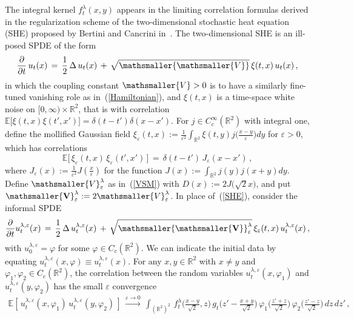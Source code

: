 \documentclass[10pt]{article}
\def\stackrel#1#2{\mathrel{\mathop{#2}\limits^{#1}}}
\numberwithin{equation}{section}
\theoremstyle{definition}
\newcommand{\R}{{\mathbb R}}
\newcommand{\vsm}{{\mathsmaller{\mathsmaller{V}}}}
\newcommand{\Da}{{D}}
\begin{document}
The integral kernel $f_{t}^{\lambda}(x,y)$ appears in the limiting correlation formulas derived in the regularization scheme of the two-dimensional stochastic heat equation (SHE) proposed by Bertini and Cancrini in~\cite{BC}.  The two-dimensional SHE is  an ill-posed SPDE of the form
\begin{align}\label{SHE}\frac{\partial}{\partial t}\,u_t(x)\,=\,\frac{1}{2}\,\Delta\, u_t(x)\,+\, \sqrt{\vsm }\,\xi (t,x)\,u_t(x) \,,  \end{align}
in which the coupling constant $\mathsmaller{V}>0$ is to have a similarly fine-tuned vanishing role as in~(\ref{Hamiltonian}), and $\xi(t,x)$ is a time-space white noise on $[0,\infty)\times \R^2$, that is with correlation $\mathbb{E}\big[ \xi(t,x) \xi(t',x')    \big]=\delta(t-t')\delta(x-x')$.  For  $j\in C_c^{\infty}(\R^2)$ with integral one, define the mollified Gaussian field  $\xi_{\varepsilon}(t,x):=  \frac{1}{\varepsilon^2}\int_{\R^2} \xi(t,y)j\big(\frac{x-y}{\varepsilon}\big)dy$ for $\varepsilon>0$, which has correlations
$$ \mathbb{E}\big[\, \xi_{\varepsilon}(t,x)\,\xi_{\varepsilon}(t',x') \,\big]\,=\,\delta(t-t')\,J_{\varepsilon}( x-x' ) \, ,
 $$
where $J_{\varepsilon}(x):=\frac{1}{\varepsilon^2} J( \frac{x}{\varepsilon}  )$ for the function $J(x):=\int_{\R^2} j(y)j(x+y)dy$.  Define $ \mathsmaller{V}_{\varepsilon}^{\lambda} $  as in~(\ref{VSM}) with $\Da(x):=2J\big(\sqrt{2}x\big)$, and put $\mathsmaller{\mathbf{V}}_{\varepsilon}^{\lambda}:=2\mathsmaller{V}_{\varepsilon}^{\lambda} $. In place of~(\ref{SHE}), consider the informal SPDE
\begin{align}\label{SHE2}  
\frac{\partial}{\partial t}u^{\lambda,\varepsilon}_{t}(x)\,=\,\frac{1}{2}\,\Delta\, u^{\lambda,\varepsilon}_{t}(x)\,+\, \sqrt{\mathbf{\vsm}_{\varepsilon}^{\lambda} }\,\xi_{\varepsilon}(t,x)\,u^{\lambda,\varepsilon}_t(x) \,,  
\end{align}
with $u^{\lambda,\varepsilon}_{0}=\varphi$ for some  $\varphi\in C_c(\R^2)$. We can  indicate the initial data by equating  $u^{\lambda,\varepsilon}_{t}(x,\varphi)\equiv u^{\lambda,\varepsilon}_t(x)$.  For any $x,y\in \R^2$ with $x\neq y$ and $\varphi_1,\varphi_2\in C_c(\R^2) $, the correlation between the random variables $   u^{\lambda,\varepsilon}_{t}(x,\varphi_1)$ and $u^{\lambda,\varepsilon}_{t}(y,\varphi_2)$ has the small $\varepsilon$ convergence 
\begin{align}\label{CorrelationLimit}
 \mathbb{E}\left[ \, u^{\lambda,\varepsilon}_{t}(x,\varphi_1)\,u^{\lambda,\varepsilon}_{t}(y,\varphi_2)\,\right] \, \stackrel{ \varepsilon\rightarrow 0
 }{\longrightarrow}   \, \int_{(\R^2)^2 }\, f^{\lambda}_t\Big( \frac{x-y}{\sqrt{2} }   , z \Big)\, g_t\Big( z' -\frac{x+y}{\sqrt{2}} \Big)     \, \varphi_1\Big( \frac{ z'+z  }{\sqrt{2}} \Big)\,\varphi_2\Big( \frac{z' -z }{\sqrt{2}} \Big)\, dz\,dz'\,,
\end{align}
\end{document}
